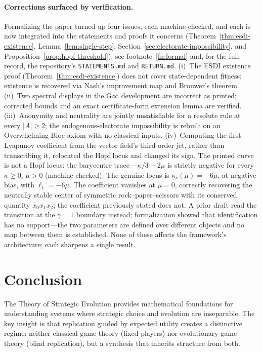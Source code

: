 \documentclass[12pt]{article}
\begin{document}
\paragraph{Corrections surfaced by verification.} Formalizing the paper turned up four issues, each machine-checked, and each is now integrated into the statements and proofs it concerns (Theorem~\ref{thm:esdi-existence}, Lemma~\ref{lem:single-step}, Section~\ref{sec:electorate-impossibility}, and Proposition~\ref{prop:hopf-threshold}); see footnote~\ref{fn:formal} and, for the full record, the repository's \texttt{STATEMENTS.md} and \texttt{RETURN.md}. (i)~The ESDI existence proof (Theorem~\ref{thm:esdi-existence}) does not cover state-dependent fitness; existence is recovered via Nash's improvement map and Brouwer's theorem. (ii)~Two spectral displays in the G$\infty$ development are incorrect as printed; corrected bounds and an exact certificate-form extension lemma are verified. (iii)~Anonymity and neutrality are jointly unsatisfiable for a resolute rule at every $|A| \geq 2$; the endogenous-electorate impossibility is rebuilt on an Overwhelming-Bloc axiom with no classical inputs. (iv)~Computing the first Lyapunov coefficient from the vector field's third-order jet, rather than transcribing it, relocated the Hopf locus and changed its sign. The printed curve is not a Hopf locus: the barycentre trace $-\kappa/3 - 2\mu$ is strictly negative for every $\kappa \geq 0$, $\mu > 0$ (machine-checked). The genuine locus is $\kappa_c(\mu) = -6\mu$, at negative bias, with $\ell_1 = -6\mu$. The coefficient vanishes at $\mu = 0$, correctly recovering the neutrally stable center of symmetric rock--paper--scissors with its conserved quantity $x_0x_1x_2$; the coefficient previously stated does not. A prior draft read the transition at the $\gamma = 1$ boundary instead; formalization showed that identification has no support---the two parameters are defined over different objects and no map between them is established. None of these affects the framework's architecture; each sharpens a single result.

\section{Conclusion}
\label{sec:conclusion}

The Theory of Strategic Evolution provides mathematical foundations for understanding systems where strategic choice and evolution are inseparable. The key insight is that replication guided by expected utility creates a distinctive regime: neither classical game theory (fixed players) nor evolutionary game theory (blind replication), but a synthesis that inherits structure from both.
\end{document}
